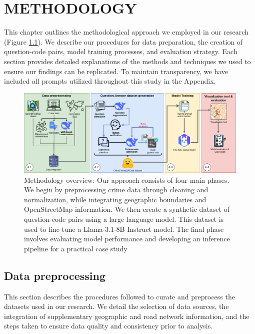 \chapter{ METHODOLOGY}

\noindent
This chapter outlines the methodological approach we employed in our research (Figure \ref{fig:methodology_overview}). We describe our procedures for data preparation, the creation of question-code pairs, model training processes, and evaluation strategy. Each section provides detailed explanations of the methods and techniques we used to ensure our findings can be replicated. To maintain transparency, we have included all prompts utilized throughout this study in the Appendix.


\begin{figure}[hbtp]
  \centering
  \includegraphics[width=\textwidth]{images/metodologiaExtended.png}
  \captionsetup{justification=raggedright,singlelinecheck=false}
  \caption{Methodology overview: Our approach consists of four main phases. We begin by preprocessing crime data through cleaning and normalization, while integrating geographic boundaries and OpenStreetMap information. We then create a synthetic dataset of question-code pairs using a large language model. This dataset is used to fine-tune a Llama-3.1-8B Instruct model. The final phase involves evaluating model performance and developing an inference pipeline for a practical case study}
  \label{fig:methodology_overview}
\end{figure}


\section{Data preprocessing}

\noindent
This section describes the procedures followed to curate and preprocess the datasets used in our research. We detail the selection of data sources, the integration of supplementary geographic and road network information, and the steps taken to ensure data quality and consistency prior to analysis.


